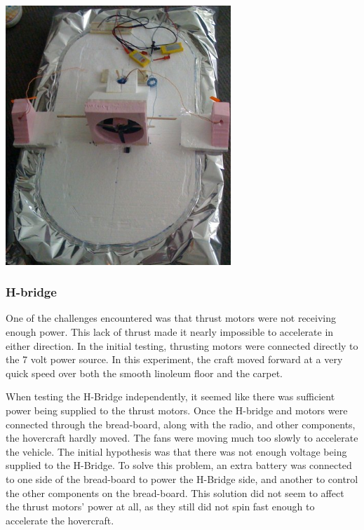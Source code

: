 \begin{minipage}{6.5in}
\begin{minipage}{6.5in}
\begin{minipage}{6.5in}
\begin{center}
  \includegraphics[width=85mm]{imageSources/turningPivot2.png}
\end{center}
\label{turningPivot2}
\end{minipage}

\subsubsection{H-bridge}
One of the challenges encountered was that thrust motors were not receiving enough power. This lack of thrust made it nearly impossible to accelerate in either direction. In the initial testing, thrusting motors were connected directly to the 7 volt power source. In this experiment, the craft moved forward at a very quick speed over both the smooth linoleum floor and the carpet.

When testing the H-Bridge independently, it seemed like there was sufficient power being supplied to the thrust motors. Once the H-bridge and motors were connected through the bread-board, along with the radio, and other components, the hovercraft hardly moved. The fans were moving much too slowly to accelerate the vehicle. The initial hypothesis was that there was not enough voltage being supplied to the H-Bridge. To solve this problem, an extra battery was connected to one side of the bread-board to power the H-Bridge side, and another to control the other components on the bread-board. This solution did not seem to affect the thrust motors' power at all, as they still did not spin fast enough to accelerate the hovercraft.


\end{minipage}
\end{minipage}
